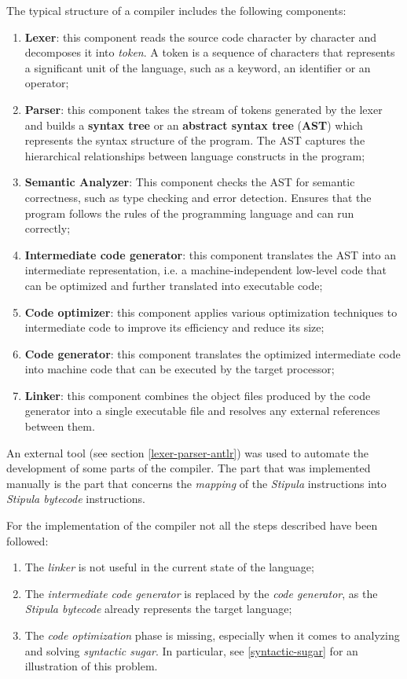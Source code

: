 The typical structure of a compiler includes the following components:
\begin{enumerate}
  \item \textbf{Lexer}: this component reads the source code character by character and decomposes it into 
  \textit{token}. A token is a sequence of characters that represents a significant unit of the language, 
  such as a keyword, an identifier or an operator;
  \item \textbf{Parser}: this component takes the stream of tokens generated by the lexer and builds a 
  \textbf{syntax tree} or an \textbf{abstract syntax tree} (\textbf{AST}) which represents the syntax 
  structure of the program. The AST captures the hierarchical relationships between language constructs in 
  the program;
  \item \textbf{Semantic Analyzer}: This component checks the AST for semantic correctness, such as type 
  checking and error detection. Ensures that the program follows the rules of the programming language and 
  can run correctly;
  \item \textbf{Intermediate code generator}: this component translates the AST into an intermediate 
  representation, i.e. a machine-independent low-level code that can be optimized and further translated 
  into executable code;
  \item \textbf{Code optimizer}: this component applies various optimization techniques to intermediate 
  code to improve its efficiency and reduce its size;
  \item \textbf{Code generator}: this component translates the optimized intermediate code into machine 
  code that can be executed by the target processor;
  \item \textbf{Linker}: this component combines the object files produced by the code generator into a 
  single executable file and resolves any external references between them.
\end{enumerate}

An external tool (see section \ref{lexer-parser-antlr}) was used to automate the development of some parts 
of the compiler. The part that was implemented manually is the part that concerns the \textit{mapping} of 
the \textit{Stipula} instructions into \textit{Stipula bytecode} instructions.

For the implementation of the compiler not all the steps described have been followed:
\begin{enumerate}
  \item The \textit{linker} is not useful in the current state of the language;
  \item The \textit{intermediate code generator} is replaced by the \textit{code generator}, as the 
  \textit{Stipula bytecode} already represents the target language;
  \item The \textit{code optimization} phase is missing, especially when it comes to analyzing and solving 
  \textit{syntactic sugar}. In particular, see \ref{syntactic-sugar} for an illustration of this problem.
\end{enumerate}

